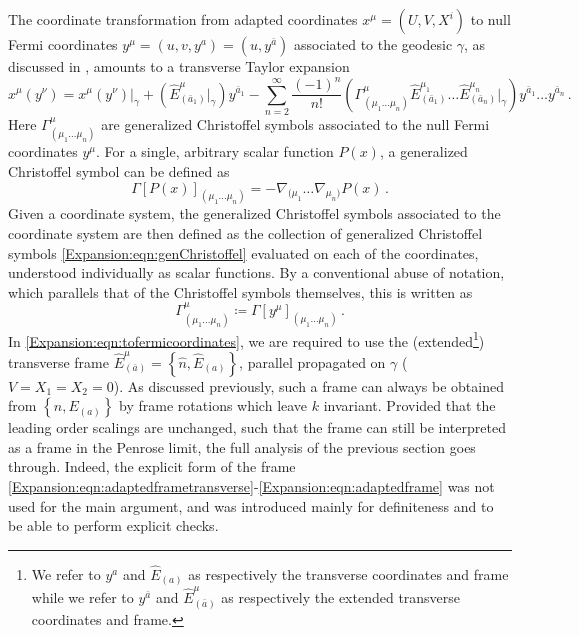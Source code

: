 The coordinate transformation from adapted coordinates $x^{\mu} =(U,V,X^{i})$ to null Fermi coordinates  $y^{\mu} = (u,v,y^{a}) = (u, y^{\bar{a}})$ associated to the geodesic $\gamma$, as discussed in \cite{Blau:2006ar}, amounts to a transverse Taylor expansion 
\begin{equation}\label{Expansion:eqn:tofermicoordinates}
x^{\mu}(y^{\nu}) = x^{\mu}(y^{\nu})|_{\gamma} + (\hat{E}^{\mu}_{(\bar{a}_1)}|_{\gamma})y^{\bar{a}_1}-\sum^{\infty}_{n=2}\frac{(-1)^n}{n!}\left( \Gamma^{\mu}_{(\mu_1 \ldots \mu_n)}\hat{E}^{\mu_1}_{(\bar{a}_1)} \ldots \hat{E}^{\mu_n}_{(\bar{a}_n)}|_{\gamma}\right)y^{\bar{a}_1} \ldots y^{\bar{a}_n}  \, .
\end{equation} 
Here $\Gamma^{\mu}_{(\mu_1 \ldots \mu_n)}$ are generalized Christoffel symbols associated to the null Fermi coordinates $y^{\mu}$. For a single, arbitrary scalar function $P(x)$, a generalized Christoffel symbol can be defined as
\begin{equation}\label{Expansion:eqn:genChristoffel}
\Gamma[P(x)]_{(\mu_1 \ldots \mu_n)} = -\nabla_{(\mu_1} \ldots \nabla_{\mu_n)} P(x)   \, .
\end{equation}
Given a coordinate system, the generalized Christoffel symbols associated to the coordinate system are then defined as the collection of generalized Christoffel symbols \eqref{Expansion:eqn:genChristoffel} evaluated on each of the coordinates, understood individually as scalar functions. By a conventional abuse of notation, which parallels that of the Christoffel symbols themselves, this is written as
\begin{equation}
\Gamma^{\mu}_{(\mu_1 \ldots \mu_n)} \coloneqq \Gamma[y^{\mu}]_{(\mu_1 \ldots \mu_n)} \, .
\end{equation} 
In \eqref{Expansion:eqn:tofermicoordinates}, we are required to use the (extended\footnote{We refer to $y^a$ and $\hat{E}_{(a)}$ as respectively the transverse coordinates and frame while we refer to $y^{\bar{a}}$ and $\hat{E}^{\mu}_{(\bar{a})}$ as respectively the extended transverse coordinates and frame.}) transverse frame $\hat{E}^{\mu}_{(\bar{a})} = \left\lbrace \hat{n}, \hat{E}_{(a)} \right\rbrace$, parallel propagated on $\gamma$ ($V=X_1=X_2 = 0$). As discussed previously, such a frame can always be obtained from $\left\lbrace n, E_{(a)} \right\rbrace$ by frame rotations which leave $k$ invariant. Provided that the leading order scalings are unchanged, such that the frame can still be interpreted as a frame in the Penrose limit, the full analysis of the previous section goes through. Indeed, the explicit form of the frame \eqref{Expansion:eqn:adaptedframetransverse}-\eqref{Expansion:eqn:adaptedframe} was not used for the main argument, and was introduced mainly for definiteness and to be able to perform explicit checks.

